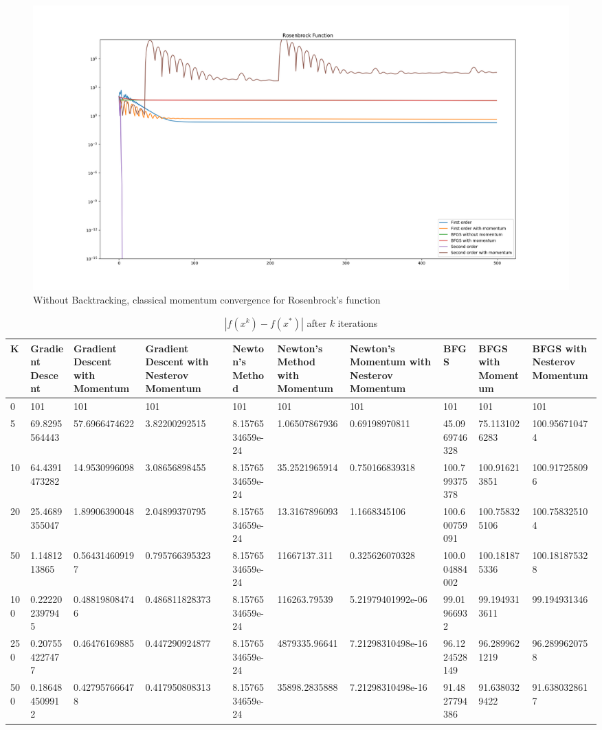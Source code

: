 \documentclass{article}
\begin{document}
\begin{figure}[H]
	\includegraphics[width=\linewidth]{../Images/rosenbrockmomentum1.png}
	\caption{Without Backtracking, classical momentum convergence for Rosenbrock's function}
	\label{fig:Without Backtracking, classical momentum convergence for Rosenbrock's function}
\end{figure}

\begin{table}[H]
	\centering
	\caption{$ | f(x^k) - f(x^*) | $ after $k$ iterations}
	\label{Rosenbrock's function table}
	\begin{tabular}{|l|l|l|l|l|l|l|l|l|l|}
		\hline
		K & Gradient Descent & Gradient Descent with Momentum & Gradient Descent with Nesterov Momentum & Newton's Method & Newton's Method with Momentum & Newton's Momentum with Nesterov Momentum & BFGS & BFGS with Momentum & BFGS with Nesterov Momentum \\
		\hline
		0 & 101 & 101 & 101 & 101 & 101 & 101 & 101 & 101 & 101 \\
		\hline
		5 & 69.8295564443 & 57.6966474622 & 3.82200292515 & 8.1576534659e-24 & 1.06507867936 & 0.69198970811 & 45.0969746328 & 75.1131026283 & 100.956710474 \\
		\hline
		10 & 64.4391473282 & 14.9530996098 & 3.08656898455 & 8.1576534659e-24 & 35.2521965914 & 0.750166839318 & 100.799375378 & 100.916213851 & 100.917258096 \\
		\hline
		20 & 25.4689355047 & 1.89906390048 & 2.04899370795 & 8.1576534659e-24 & 13.3167896093 & 1.1668345106 & 100.600759091 & 100.758325106 & 100.758325104 \\
		\hline
		50 & 1.1481213865 & 0.564314609197 & 0.795766395323 & 8.1576534659e-24 & 11667137.311 & 0.325626070328 & 100.004884002 & 100.181875336 & 100.181875328 \\
		\hline
		100 & 0.222202397945 & 0.488198084746 & 0.486811828373 & 8.1576534659e-24 & 116263.79539 & 5.21979401992e-06 & 99.01966932 & 99.1949313611 & 99.194931346 \\
		\hline
		250 & 0.207554227477 & 0.46476169885 & 0.447290924877 & 8.1576534659e-24 & 4879335.96641 & 7.21298310498e-16 & 96.1224528149 & 96.2899621219 & 96.2899620758 \\
		\hline
		500 & 0.186484509912 & 0.427957666478 & 0.417950808313 & 8.1576534659e-24 & 35898.2835888 & 7.21298310498e-16 & 91.4827794386 & 91.6380329422 & 91.6380328617 \\
		\hline
	\end{tabular}
\end{table}
\end{document}
